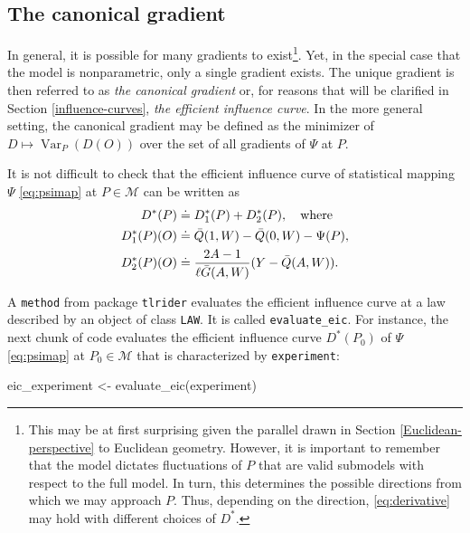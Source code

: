 \documentclass[
  11pt,
  openright,twoside]{book}
\newenvironment{Shaded}{\begin{snugshade}}{\end{snugshade}}
\newcommand{\FunctionTok}[1]{\textcolor[rgb]{0.00,0.00,0.00}{#1}}
\newcommand{\NormalTok}[1]{#1}
\newcommand{\OtherTok}[1]{\textcolor[rgb]{0.56,0.35,0.01}{#1}}
\DeclareMathOperator{\Var}{Var}
\newcommand{\defq}{\doteq}
\newcommand{\calM}{\mathcal{M}}
\newcommand{\Gbar}{\bar{G}}
\newcommand{\Qbar}{\bar{Q}}
\theoremstyle{definition}
\theoremstyle{definition}
\theoremstyle{definition}
\theoremstyle{definition}
\theoremstyle{remark}
\begin{document}
\hypertarget{canonical-gradient}{%
\subsection{The canonical gradient}\label{canonical-gradient}}

In general, it is possible for many gradients to exist\footnote{This may be at first
  surprising given the parallel drawn in Section \ref{Euclidean-perspective} to
  Euclidean geometry. However, it is important to remember that the model
  dictates fluctuations of \(P\) that are valid submodels with respect to the full
  model. In turn, this determines the possible directions from which we may
  approach \(P\). Thus, depending on the direction, \eqref{eq:derivative} may hold
  with different choices of \(D^*\).}. Yet, in the special case that the model is
nonparametric, only a single gradient exists. The unique gradient is then
referred to as \emph{the canonical gradient} or,
for reasons that will be clarified in Section \ref{influence-curves}, \emph{the efficient influence curve}. In the
more general setting, the canonical gradient may be defined as the minimizer
of \(D\mapsto \Var_{P} (D(O))\) over the set of all gradients of \(\Psi\) at \(P\).

It is not difficult to check that the efficient influence curve of statistical
mapping \(\Psi\) \eqref{eq:psimap} at \(P \in \calM\) can be written as
\begin{align}  D^{*}(P)  &  \defq  D_{1}^{*}   (P)  +  D_{2}^{*}  (P),  \quad
\text{where} \label{eq:eif}\\  D_{1}^{*}(P) (O) &\defq \Qbar(1,W)  - \Qbar(0,W) -
\Psi(P),  \notag\\ D_{2}^{*}(P)  (O)  &\defq \frac{2A-1}{\ell\Gbar(A,W)}(Y  -
\Qbar(A,W)).\notag \end{align}

A \texttt{method} from package \texttt{tlrider} evaluates the efficient influence curve at a
law described by an object of class \texttt{LAW}. It is called \texttt{evaluate\_eic}. For
instance, the next chunk of code evaluates the efficient influence curve
\(D^{*}(P_{0})\) of \(\Psi\) \eqref{eq:psimap} at \(P_{0} \in \calM\) that is
characterized by \texttt{experiment}:

\begin{Shaded}
\begin{Highlighting}[]
\NormalTok{eic\_experiment }\OtherTok{\textless{}{-}} \FunctionTok{evaluate\_eic}\NormalTok{(experiment)}
\end{Highlighting}
\end{Shaded}
\end{document}
